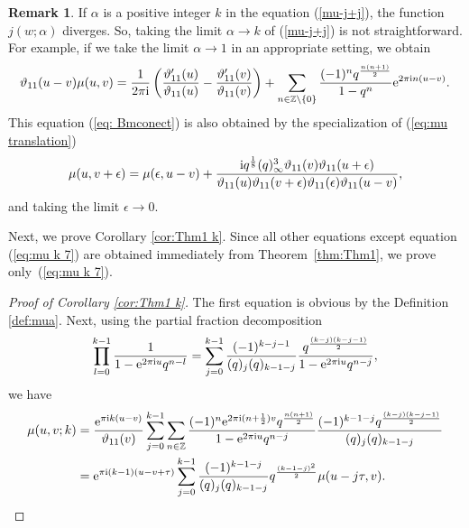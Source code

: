 \documentclass[pdftex]{sigma}
\numberwithin{equation}{section}
\theoremstyle{definition}
\newtheorem{rmk}[thm]{Remark}
\newcommand{\Zz}{\mathbb{Z}}
\begin{document}
\begin{rmk}
If $\alpha$ is a positive integer $k$ in the equation (\ref{mu-j+j}), the function $j(w;\alpha)$ diverges.
So, taking the limit $\alpha \to k$ of (\ref{mu-j+j}) is not straightforward.
For example, if we take the limit $\alpha \to 1$ in an appropriate setting, we obtain
\begin{gather}
\label{eq: Bmconect}
\vartheta_{11}(u-v)\mu(u,v)
=\frac{1}{2\pi{\rm i}}\left(\frac{\vartheta_{11}'(u)}{\vartheta_{11}(u)}-\frac{\vartheta_{11}'(v)}{\vartheta_{11}(v)}\right)+\sum_{n \in \mathbb{Z}\setminus \{0\}}\frac{(-1)^nq^\frac{n(n+1)}{2}}{1-q^n}{\rm e}^{2\pi{\rm i}n(u-v)}.
\end{gather}
This equation (\ref{eq: Bmconect}) is also obtained by the specialization of (\ref{eq:mu translation})
\[
\mu(u,v+\epsilon)=\mu(\epsilon,u-v)+\frac{{\rm i}q^{\frac{1}{8}}(q)_{\infty }^{3}\vartheta_{11}(v)\vartheta_{11}(u+\epsilon)}{\vartheta_{11}(u)\vartheta_{11}(v+\epsilon)\vartheta_{11}(\epsilon)\vartheta_{11}(u-v)},
\]
and taking the limit $\epsilon \to 0$.
\end{rmk}
Next, we prove Corollary \ref{cor:Thm1 k}.
Since all other equations except equation (\ref{eq:mu k 7}) are obtained immediately from Theorem~\ref{thm:Thm1}, we prove only~(\ref{eq:mu k 7}).

\begin{proof}[Proof of Corollary \ref{cor:Thm1 k}]
The first equation is obvious by the Definition \ref{def:mua}.
Next, using the partial fraction decomposition
\[
\prod_{l=0}^{k-1}\frac{1}{1-{\rm e}^{2\pi{\rm i}u}q^{n-l}}
 =
 \sum_{j=0}^{k-1}\frac{(-1)^{k-j-1}}{(q)_j(q)_{k-1-j}}\frac{q^{\frac{(k-j)(k-j-1)}{2}}}{1-{\rm e}^{2\pi{\rm i}u}q^{n-j}},
\]
we have
\begin{align*}
\mu(u,v;k)
 &=
 \frac{{\rm e}^{\pi{\rm i}k(u-v)}}{\vartheta_{11}(v)}\sum_{j=0}^{k-1}\sum_{n\in\Zz}\frac{(-1)^n{\rm e}^{2\pi{\rm i}(n+\frac{1}{2})v}q^\frac{n(n+1)}{2}}{1-{\rm e}^{2\pi{\rm i}u}q^{n-j}}\frac{(-1)^{k-1-j}q^\frac{(k-j)(k-j-1)}{2}}{(q)_j(q)_{k-1-j}} \\
 &=
 {\rm e}^{\pi{\rm i}(k-1)(u-v+\tau)}\sum_{j=0}^{k-1}\frac{(-1)^{k-1-j}}{(q)_j(q)_{k-1-j}}q^\frac{(k-1-j)^2}{2}\mu(u-j\tau,v).\tag*{\qed}
\end{align*}
\renewcommand{\qed}{}
\end{proof}
\end{document}
